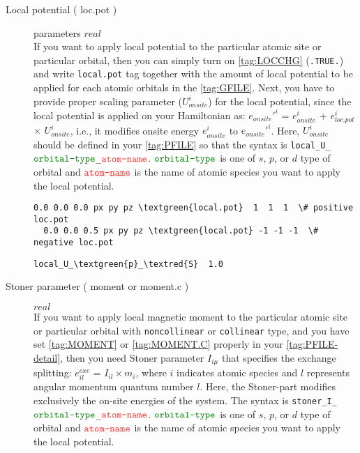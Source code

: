 \documentclass[a4paper,12pt]{scrartcl}
\makeatletter
\def\namedlabel#1#2{\begingroup
    #2%
    \def\@currentlabel{#2}%
    \phantomsection\label{#1}\endgroup
}
\newcommand{\textred}[1]{\textcolor{red!85!white}{\texttt{#1}}}
\newcommand{\textgreen}[1]{\textcolor{green!50!black}{\texttt{#1}}}
\makeatother
\begin{document}
\begin{description}
    \item[Local potential (\namedlabel{tag:param-locpot}{loc.pot})] parameters $real$ \\
		If you want to apply local potential to the particular atomic site or
		particular orbital, then you can simply turn on \ref{tag:LOCCHG}
		(\texttt{.TRUE.}) and write \texttt{local.pot} tag together with the amount of
		local potential to be applied for each atomic orbitals in the \ref{tag:GFILE}.
		Next, you have to provide proper scaling parameter ($U_{onsite}^i$) for the local 
		potential, since the local potential is applied on your Hamiltonian
		as: $e_{onsite}'^i$ = $e_{onsite}^i$ + $e_{loc.pot}^i$ $\times$ $U_{onsite}^i$,
		i.e., it modifies onsite energy $e_{onsite}^i$ to $e_{onsite}'^i$.
		Here, $U_{onsite}^i$ should be defined in your \ref{tag:PFILE} so that
		the syntax is \texttt{local\_U\_$\textgreen{orbital-type}$\_$\textred{atom-name}$}.
		$\textgreen{orbital-type}$ is one of $s$, $p$, or $d$ type of orbital and 
		$\textred{atom-name}$ is the name of atomic species you want to apply the local
		potential.
\begin{Verbatim}[commandchars=\\\{\},gobble=4, frame=single, framesep=2mm, 
    label= example of \textgreen{local.pot} tag in \ref{tag:GFILE},
    labelposition=bottomline]
  0.0 0.0 0.0 px py pz \textgreen{local.pot}  1  1  1  \# positive loc.pot
  0.0 0.0 0.5 px py pz \textgreen{local.pot} -1 -1 -1  \# negative loc.pot
\end{Verbatim}
\begin{Verbatim}[commandchars=\\\{\},gobble=4, frame=single, framesep=2mm, 
    label= example of \textgreen{local.pot} parameter  in \ref{tag:PFILE},
    labelposition=bottomline]
    local_U_\textgreen{p}_\textred{S}  1.0
\end{Verbatim}

    \item[Stoner parameter (\namedlabel{tag:param-moment}{moment or moment.c})] $real$ \\
		If you want to apply local magnetic moment to the particular atomic site or
		particular orbital with \texttt{noncollinear} or \texttt{collinear} type, and you have set
		\ref{tag:MOMENT} or \ref{tag:MOMENT.C} properly in your \ref{tag:PFILE-detail}, then 
		you need Stoner parameter $I_{i\mu}$ that specifies the exchange splitting:
		$e_{il}^{exc}$ = $I_{il} \times m_i$, where $i$ indicates atomic species and $l$
		represents angular momentum quantum number $l$. 
		Here, the Stoner-part modifies exclusively the on-site energies of the system.
		The syntax is \texttt{stoner\_I\_$\textgreen{orbital-type}$\_$\textred{atom-name}$}.
		$\textgreen{orbital-type}$ is one of $s$, $p$, or $d$ type of orbital and 
		$\textred{atom-name}$ is the name of atomic species you want to apply the local
		potential.
		

\end{description}
\end{document}
